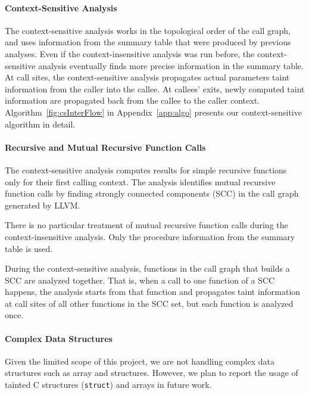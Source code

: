 \paragraph{Context-Sensitive Analysis}
The context-sensitive analysis works in the topological order
of the call graph, and uses information from the summary table
that were produced by previous analyses. Even if the context-insensitive
analysis was run before, the context-sensitive analysis eventually
finds more precise information in the summary table. At call sites,
the context-sensitive analysis propagates actual parameters
taint information from the caller into the callee. At callees' exits,
newly computed taint information are propagated back from the
callee to the caller context. Algorithm~\ref{fig:csInterFlow}
in Appendix~\ref{app:algo} presents our context-sensitive
algorithm in detail.

\paragraph{Recursive and Mutual Recursive Function Calls} 
The context-sensitive analysis computes results for simple recursive
functions only for their first calling context.
The analysis identifies mutual recursive function calls by finding
strongly connected components (SCC) in the call graph generated
by LLVM.

There is no particular treatment of mutual recursive function
calls during the context-insensitive analysis. Only the
procedure information from the summary table is used.

During the context-sensitive analysis, functions in the call
graph that builds a SCC are analyzed together.
That is, when a call to one function of a SCC happens,
the analysis starts from that function and propagates taint
information at call sites of all other functions in the SCC
set, but each function is analyzed once.

\paragraph{Complex Data Structures}

Given the limited scope of this project, we are not handling
complex data structures such as array and structures.
However, we plan to report the usage of tainted C structures
(\texttt{struct}) and arrays in future work.
